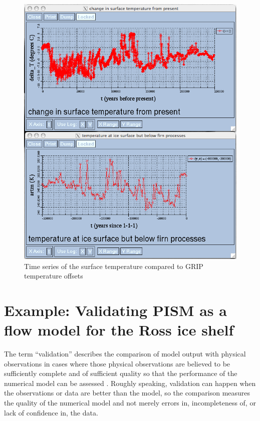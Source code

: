 \documentclass[11pt,final]{amsart}
\begin{document}
\begin{figure}[ht]
  \centering
  \includegraphics[width=5in]{figs/artm_timeseries}
  \caption{Time series of the surface temperature compared to GRIP temperature offsets}
  \label{fig:artm-timeseries}
\end{figure}

\clearpage\newpage
\section{Example: Validating PISM as a flow model for the Ross ice shelf}\label{sect:ross}     The term ``validation'' describes the comparison of model output with physical observations in cases where those physical observations are believed to be sufficiently complete and of sufficient quality so that the performance of the numerical model can be assessed \cite{Roache,Wesseling}.  Roughly speaking, validation can happen when the observations or data are better than the model, so the comparison measures the quality of the numerical model and not merely errors in, incompleteness of, or lack of confidence in, the data.
\end{document}
